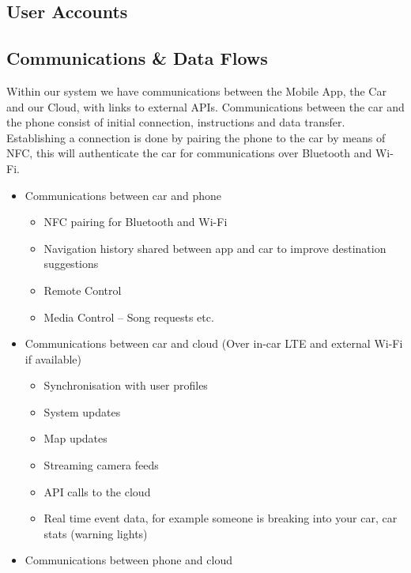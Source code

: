 \documentclass{article}
\begin{document}
\subsection{User Accounts} \label{ssec:user-accounts} \label{ssec:user-accounts}
  \begin{itemize}
  
  
\subsection{Communications \& Data Flows} \label{ssec:communications-data}
Within our system we have communications between the Mobile App, the Car and our Cloud, with links to external APIs.
\newline
Communications between the car and the phone consist of initial connection, instructions and data transfer. Establishing a connection is done by pairing the phone to the car by means of NFC, this will authenticate the car for communications over Bluetooth and Wi-Fi.
  \begin{itemize}
      \item Communications between car and phone
      \begin{itemize}     
        	\item NFC pairing for Bluetooth and Wi-Fi
            \item Navigation history shared between app and car to improve destination suggestions
            \item Remote Control
            \item Media Control -- Song requests etc.
	  \end{itemize}
	  \item Communications between car and cloud (Over in-car LTE and external Wi-Fi if available)     	
        \begin{itemize}
          \item Synchronisation with user profiles
          \item System updates
          \item Map updates
          \item Streaming camera feeds
          \item API calls to the cloud
          \item Real time event data, for example someone is breaking into your car, car stats (warning lights)
        \end{itemize}
      \item Communications between phone and cloud      
        \begin{itemize}

\end{itemize}
\end{itemize}
\end{itemize}
\end{document}
